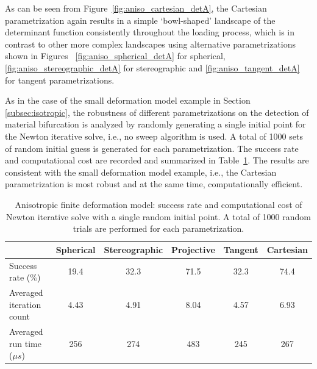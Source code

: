 \documentclass[12pt]{article}
\numberwithin{equation}{section}
\begin{document}
As can be seen from Figure~\ref{fig:aniso_cartesian_detA}, the
Cartesian parametrization again results in a simple `bowl-shaped'
landscape of the determinant function consistently throughout the
loading process, which is in contrast to other more complex landscapes
using alternative parametrizations shown in Figures~
\ref{fig:aniso_spherical_detA} for spherical,
\ref{fig:aniso_stereographic_detA} for stereographic and
\ref{fig:aniso_tangent_detA} for tangent parametrizations.

As in the case of the small deformation model example in
Section \ref{subsec:isotropic}, the robustness of different
parametrizations on the detection of material bifurcation is analyzed
by randomly generating a single initial point for the Newton iterative
solve, i.e., no sweep algorithm is used. A total of 1000 sets of
random initial guess is generated for each parametrization. The
success rate and computational cost are recorded and summarized in
Table~\ref{tab:aniso_axial_random_para}. The results are consistent
with the small deformation model example, i.e., the Cartesian
parametrization is most robust and at the same time, computationally efficient.

\begin{table}[H]
  \begin{center}
    \begin{tabular}{l | c c c c c}
      \toprule
        &  Spherical    &   Stereographic   & Projective   &   Tangent   &   Cartesian                 \\
      \midrule
      Success rate ($\%$)                      &    19.4    &    32.3     &    71.5     &    32.3     &     74.4          \\
      Averaged iteration count               &    4.43    &    4.91    &    8.04     &    4.57    &    6.93         \\
      Averaged run time (${\mu}s$)     &    256     &    274     &    483      &    245      &    267         \\
      \bottomrule
    \end{tabular}
    \caption{Anisotropic finite deformation model: success rate and computational cost of Newton iterative solve with a single random initial point. A total of 1000 random trials are performed for each parametrization.}
    \label{tab:aniso_axial_random_para}
  \end{center}
\end{table}
\end{document}
